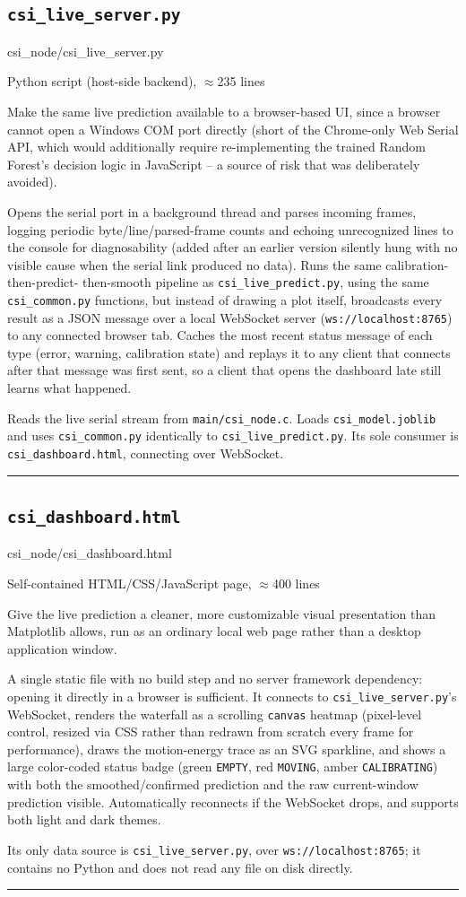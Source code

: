 \documentclass[11pt,a4paper]{article}
\newcommand{\filepath}[1]{{\small\ttfamily\color{pathgray}#1}}
\newcommand{\fileentry}[6]{%
    \subsection{\texttt{#1}}
    \filepath{#2}
    \vspace{0.15cm}
    \begin{description}[leftmargin=2.6cm, style=nextline]
        \item[Type] #3
        \item[Objective] #4
        \item[Role] #5
        \item[Connections] #6
    \end{description}
    \vspace{0.2cm}
    \hrule
    \vspace{0.3cm}
}
\begin{document}
\fileentry
{csi\_live\_server.py}
{csi\_node/csi\_live\_server.py}
{Python script (host-side backend), \(\approx\)235 lines}
{Make the same live prediction available to a browser-based UI, since a
    browser cannot open a Windows COM port directly (short of the
    Chrome-only Web Serial API, which would additionally require
    re-implementing the trained Random Forest's decision logic in
    JavaScript -- a source of risk that was deliberately avoided).}
{Opens the serial port in a background thread and parses incoming
    frames, logging periodic byte/line/parsed-frame counts and echoing
    unrecognized lines to the console for diagnosability (added after an
    earlier version silently hung with no visible cause when the serial
    link produced no data). Runs the same calibration-then-predict-
    then-smooth pipeline as \texttt{csi\_live\_predict.py}, using the
    same \texttt{csi\_common.py} functions, but instead of drawing a
    plot itself, broadcasts every result as a JSON message over a local
    WebSocket server (\texttt{ws://localhost:8765}) to any connected
    browser tab. Caches the most recent status message of each type
    (error, warning, calibration state) and replays it to any client
    that connects after that message was first sent, so a client that
    opens the dashboard late still learns what happened.}
{Reads the live serial stream from \texttt{main/csi\_node.c}. Loads
    \texttt{csi\_model.joblib} and uses \texttt{csi\_common.py}
    identically to \texttt{csi\_live\_predict.py}. Its sole consumer is
    \texttt{csi\_dashboard.html}, connecting over WebSocket.}

\fileentry
{csi\_dashboard.html}
{csi\_node/csi\_dashboard.html}
{Self-contained HTML/CSS/JavaScript page, \(\approx\)400 lines}
{Give the live prediction a cleaner, more customizable visual
    presentation than Matplotlib allows, run as an ordinary local web
    page rather than a desktop application window.}
{A single static file with no build step and no server framework
    dependency: opening it directly in a browser is sufficient. It
    connects to \texttt{csi\_live\_server.py}'s WebSocket, renders the
    waterfall as a scrolling \texttt{canvas} heatmap (pixel-level
    control, resized via CSS rather than redrawn from scratch every
    frame for performance), draws the motion-energy trace as an SVG
    sparkline, and shows a large color-coded status badge (green
    \texttt{EMPTY}, red \texttt{MOVING}, amber \texttt{CALIBRATING}) with
    both the smoothed/confirmed prediction and the raw current-window
    prediction visible. Automatically reconnects if the WebSocket drops,
    and supports both light and dark themes.}
{Its only data source is \texttt{csi\_live\_server.py}, over
    \texttt{ws://localhost:8765}; it contains no Python and does not
    read any file on disk directly.}
\end{document}
